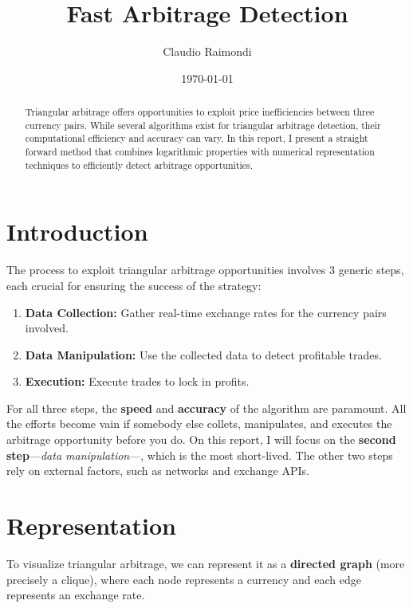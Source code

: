 \documentclass[11pt]{article}
\begin{document}
\title{Fast Arbitrage Detection}
\author{Claudio Raimondi}
\date{\today}
\maketitle

\begin{abstract}
Triangular arbitrage offers opportunities to exploit price inefficiencies between three currency pairs. While several algorithms exist for triangular arbitrage detection, their computational efficiency and accuracy can vary. In this report, I present a straight forward method that combines logarithmic properties with numerical representation techniques to efficiently detect arbitrage opportunities.
\end{abstract}

\tableofcontents

\section{Introduction}
The process to exploit triangular arbitrage opportunities involves 3 generic steps, each crucial for ensuring the success of the strategy:
\begin{enumerate}
    \item \textbf{Data Collection:} Gather real-time exchange rates for the currency pairs involved.
    \item \textbf{Data Manipulation:} Use the collected data to detect profitable trades.
    \item \textbf{Execution:} Execute trades to lock in profits.
\end{enumerate}
For all three steps, the \textbf{speed} and \textbf{accuracy} of the algorithm are paramount. All the efforts become vain if somebody else collets, manipulates, and executes the arbitrage opportunity before you do.
On this report, I will focus on the \textbf{second step}---\textit{data manipulation}---, which is the most short-lived. The other two steps rely on external factors, such as networks and exchange APIs.

\section{Representation}
To visualize triangular arbitrage, we can represent it as a \textbf{directed graph} (more precisely a clique), where each node represents a currency and each edge represents an exchange rate.
\end{document}
